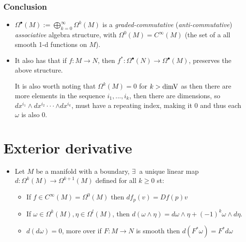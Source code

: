 \documentclass[11pt]{article}
\numberwithin{equation}{section}
\begin{document}
\subsubsection{Conclusion}
\begin{itemize}
    \item $\Omega^{\bullet}(M):= \bigoplus_{k=0}^{\infty}\Omega^k(M)$ is a \emph{graded-commutative} (\emph{anti-commutative}) \emph{associative} algebra structure, with $\Omega^0(M) = C^{\infty}(M)$ (the set of a all smooth 1-d functions on $M$). 

\item It also has that if $f:M\rightarrow N$, then $f^{\ast}:\Omega^{\bullet}(N)\rightarrow\Omega^{\bullet}(M)$, preserves the above structure. 

It is also worth noting that $\Omega^k(M)=0$ for $k>\rm dimV$ as then there are more elements in the sequence $i_1,...,i_k$, then there are dimensions, so $dx^{i_1}\wedge dx^{i_2}\cdot \cdot   \cdot \wedge dx^{i_k}$, must have a repeating index, making it $0$ and thus each $\omega$ is also $0$. 
\end{itemize}


\newpage
\section{Exterior derivative}
\begin{itemize}
    \item Let $M$ be a manifold with a boundary, $\exists~$ a unique linear map $d: \Omega^k(M)\rightarrow\Omega^{k+1}(M)$ defined for all $k\geq 0$ st:
\begin{itemize}
    \item If $f \in C^{\infty}(M) = \Omega^0(M)$ then $df_p(v)= Df(p)v$
    \item If $\omega \in \Omega^k(M), \eta \in \Omega^l(M)$, then $d(\omega \wedge \eta) = d\omega\wedge \eta + (-1)^k\omega\wedge d\eta$. 
    \item $d(d\omega)=0$, more over if $F:M\rightarrow N$ is smooth then $d(F^{\ast}\omega) = F^{\ast}d\omega$ 
\end{itemize}
\end{itemize}
\end{document}
